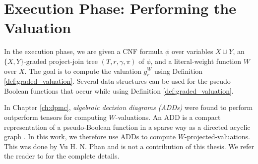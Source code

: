 \section{Execution Phase: Performing the Valuation}
\label{sec:procount:execution}

In the execution phase, we are given a CNF formula $\phi$ over variables $X \cup Y$, an $\{X, Y\}$-graded project-join tree $(T, r, \gamma, \pi)$ of $\phi$, and a literal-weight function $W$ over $X$.
The goal is to compute the valuation $g^W_r$ using Definition \ref{def:graded_valuation}.
Several data structures can be used for the pseudo-Boolean functions that occur while using Definition \ref{def:graded_valuation}.

In Chapter \ref{ch:dpmc}, \emph{algebraic decision diagrams (ADDs)} were found to perform outperform tensors for computing $W$-valuations.
An ADD is a compact representation of a pseudo-Boolean function in a sparse way as a directed acyclic graph \cite{bahar1997algebraic}.
In this work, we therefore use ADDs to compute $W$-projected-valuations.
This was done by Vu H. N. Phan and is not a contribution of this thesis. We refer the reader to \cite{phan2021phd} for the complete details.

